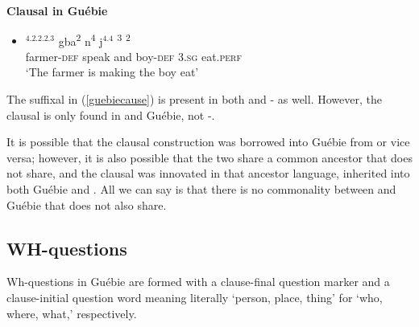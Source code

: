 \documentclass[output=paper,modfonts]{langscibook}
\begin{document}
\begin{exe}
\ex \textbf{Clausal  in Guébie}
\begin{itemize}
\item[ ] \gll {}$^{4.2.2.2.3}$ gba\textipa{}\textsuperscript{2} n\textsuperscript{4} j$^{4.4}$ \textsuperscript{3} \textsuperscript{2}\\
farmer-\textsc{def} speak and boy-\textsc{def} \textsc{3.sg} eat.\textsc{perf}\\
\trans `The farmer is making the boy eat'
\end{itemize}
\end{exe}

The suffixal  in (\ref{guebiecause}) is present in both  and - as well. However, the clausal  is only found in  and Guébie, not -.


It is possible that the clausal  construction was borrowed into Guébie from  or vice versa; however, it is also possible that the two share a common ancestor that  does not share, and the clausal  was innovated in that ancestor language, inherited into both Guébie and . All we can say is that there is no commonality between  and Guébie that  does not also share.


\subsection{WH-questions}
Wh-questions in Guébie are formed with a clause-final question marker and a clause-initial question word meaning literally `person, place, thing' for `who, where, what,' respectively.
\end{document}
